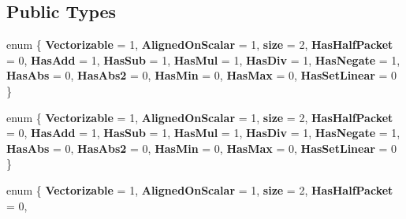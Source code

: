 \subsection*{Public Types}
\begin{DoxyCompactItemize}
\item 
\mbox{\label{struct_eigen_1_1internal_1_1packet__traits_3_01std_1_1complex_3_01float_01_4_01_4_a28f99d6d2d399578955b121db3d736fd}} 
enum \{ \newline
{\bfseries Vectorizable} = 1, 
{\bfseries Aligned\+On\+Scalar} = 1, 
{\bfseries size} = 2, 
{\bfseries Has\+Half\+Packet} = 0, 
\newline
{\bfseries Has\+Add} = 1, 
{\bfseries Has\+Sub} = 1, 
{\bfseries Has\+Mul} = 1, 
{\bfseries Has\+Div} = 1, 
\newline
{\bfseries Has\+Negate} = 1, 
{\bfseries Has\+Abs} = 0, 
{\bfseries Has\+Abs2} = 0, 
{\bfseries Has\+Min} = 0, 
\newline
{\bfseries Has\+Max} = 0, 
{\bfseries Has\+Set\+Linear} = 0
 \}
\item 
\mbox{\label{struct_eigen_1_1internal_1_1packet__traits_3_01std_1_1complex_3_01float_01_4_01_4_ae8b64c9391116fe21a383ba748f1b407}} 
enum \{ \newline
{\bfseries Vectorizable} = 1, 
{\bfseries Aligned\+On\+Scalar} = 1, 
{\bfseries size} = 2, 
{\bfseries Has\+Half\+Packet} = 0, 
\newline
{\bfseries Has\+Add} = 1, 
{\bfseries Has\+Sub} = 1, 
{\bfseries Has\+Mul} = 1, 
{\bfseries Has\+Div} = 1, 
\newline
{\bfseries Has\+Negate} = 1, 
{\bfseries Has\+Abs} = 0, 
{\bfseries Has\+Abs2} = 0, 
{\bfseries Has\+Min} = 0, 
\newline
{\bfseries Has\+Max} = 0, 
{\bfseries Has\+Set\+Linear} = 0
 \}
\item 
\mbox{\label{struct_eigen_1_1internal_1_1packet__traits_3_01std_1_1complex_3_01float_01_4_01_4_ae08930d0fde577ba833c7869b2e0f698}} 
enum \{ \newline
{\bfseries Vectorizable} = 1, 
{\bfseries Aligned\+On\+Scalar} = 1, 
{\bfseries size} = 2, 
{\bfseries Has\+Half\+Packet} = 0, 
\newline

\end{DoxyCompactItemize}
